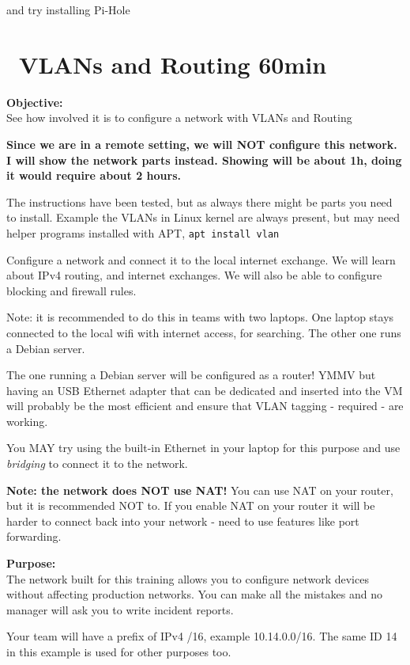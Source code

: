 \documentclass[a4paper,11pt,notitlepage]{report}
\begin{document}
and try installing Pi-Hole 





\chapter{\faInfoCircle\ VLANs and Routing 60min}
\label{ex:vlans-routing-rpf}

{\bf Objective:}\\
See how involved it is to configure a network with VLANs and Routing


{\bf Since we are in a remote setting, we will NOT configure this network. I will show the network parts instead. Showing will be about 1h, doing it would require about 2 hours.}

The instructions have been tested, but as always there might be parts you need to install. Example the VLANs in Linux kernel are always present, but may need helper programs installed with APT, \verb+apt install vlan+

Configure a network and connect it to the local internet exchange. We will learn about IPv4 routing, and internet exchanges. We will also be able to configure blocking and firewall rules.

Note: it is recommended to do this in teams with two laptops. One laptop stays connected to the local wifi with internet access, for searching. The other one runs a Debian server.

The one running a Debian server will be configured as a router! YMMV but having an USB Ethernet adapter that can be dedicated and inserted into the VM will probably be the most efficient and ensure that VLAN tagging - required - are working.

You MAY try using the built-in Ethernet in your laptop for this purpose and use \emph{bridging} to connect it to the network.

{\bf Note: the network does NOT use NAT!} You can use NAT on your router, but it is recommended NOT to. If you enable NAT on your router it will be harder to connect back into your network - need to use features like port forwarding.

{\bf Purpose:}\\
The network built for this training allows you to configure network devices without affecting production networks. You can make all the mistakes and no manager will ask you to write incident reports.

Your team will have a prefix of IPv4 /16, example 10.14.0.0/16. The same ID 14 in this example is used for other purposes too.
\end{document}

